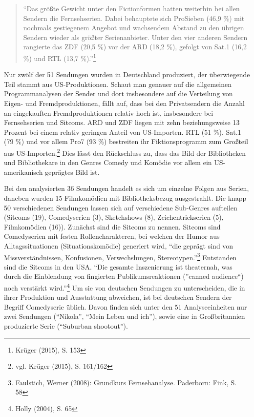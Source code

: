 \begin{quote}
\enquote{Das größte Gewicht unter den Fictionformen hatten weiterhin bei
allen Sendern die Fernsehserien. Dabei behauptete sich ProSieben (46,9
\%) mit nochmals gestiegenem Angebot und wachsendem Abstand zu den
übrigen Sendern wieder als größter Serienanbieter. Unter den vier
anderen Sendern rangierte das ZDF (20,5 \%) vor der ARD (18,2 \%),
gefolgt von Sat.1 (16,2 \%) und RTL (13,7 \%).}\footnote{Krüger (2015),
  S. 153}
\end{quote}

Nur zwölf der 51 Sendungen wurden in Deutschland produziert, der
überwiegende Teil stammt aus US-Produktionen. Schaut man genauer auf die
allgemeinen Programmanalysen der Sender und dort insbesondere auf die
Verteilung von Eigen- und Fremdproduktionen, fällt auf, dass bei den
Privatsendern die Anzahl an eingekauften Fremdproduktionen relativ hoch
ist, insbesondere bei Fernsehserien und Sitcoms. ARD und ZDF liegen mit
zehn beziehungsweise 13 Prozent bei einem relativ geringen Anteil von
US-Importen. RTL (51 \%), Sat.1 (79 \%) und vor allem Pro7 (93 \%)
bestreiten ihr Fiktionsprogramm zum Großteil aus US-Importen.\footnote{vgl.
  Krüger (2015), S. 161/162} Dies lässt den Rückschluss zu, dass das
Bild der Bibliotheken und Bibliothekare in den Genres Comedy und Komödie
vor allem ein US-amerikanisch geprägtes Bild ist.

Bei den analysierten 36 Sendungen handelt es sich um einzelne Folgen aus
Serien, daneben wurden 15 Filmkomödien mit Bibliotheksbezug
ausgestrahlt. Die knapp 50 verschiedenen Sendungen lassen sich auf
verschiedene Sub-Genres aufteilen (Sitcoms (19), Comedyserien (3),
Sketchshows (8), Zeichentrickserien (5), Filmkomödien (16)). Zunächst
sind die Sitcoms zu nennen. Sitcoms sind Comedyserien mit festen
Rollencharakteren, bei welchen der Humor aus Alltagssituationen
(Situationskomödie) generiert wird, \enquote{die geprägt sind von
Missverständnissen, Konfusionen, Verwechslungen, Stereotypen.}\footnote{Faulstich,
  Werner (2008): Grundkurs Fernsehanalyse. Paderborn: Fink, S. 58}
Entstanden sind die Sitcoms in den USA. \enquote{Die gesamte
Inszenierung ist theaternah, was durch die Einblendung von fingierten
Publikumsreaktionen (}canned audience\enquote{) noch verstärkt
wird.}\footnote{Holly (2004), S. 65} Um sie von deutschen Sendungen zu
unterscheiden, die in ihrer Produktion und Ausstattung abweichen, ist
bei deutschen Sendern der Begriff Comedyserie üblich. Davon finden sich
unter den 51 Analyseeinheiten nur zwei Sendungen (\enquote{Nikola},
\enquote{Mein Leben und ich}), sowie eine in Großbritannien produzierte
Serie (\enquote{Suburban shootout}).

